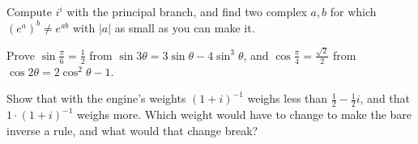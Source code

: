 \begin{exercisebox}
  Compute $i^i$ with the principal branch, and find two complex $a, b$ for which
  $(e^a)^b \neq e^{ab}$ with $|a|$ as small as you can make it.
\end{exercisebox}

\begin{exercisebox}
  Prove $\sin\frac{\pi}{6} = \frac{1}{2}$ from $\sin 3\theta = 3\sin\theta - 4\sin^3\theta$, and
  $\cos\frac{\pi}{4} = \frac{\sqrt 2}{2}$ from $\cos 2\theta = 2\cos^2\theta - 1$.
\end{exercisebox}

\begin{exercisebox}
  Show that with the engine's weights $(1 + i)^{-1}$ weighs less than $\frac{1}{2} - \frac{1}{2}i$,
  and that $1 \cdot (1 + i)^{-1}$ weighs more. Which weight would have to change to make the bare
  inverse a rule, and what would that change break?
\end{exercisebox}
